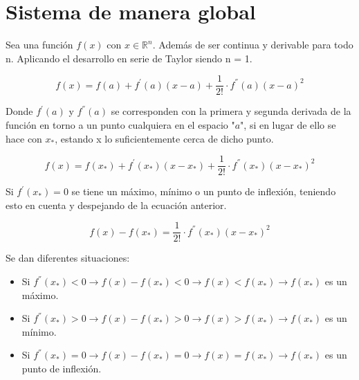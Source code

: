
\newpage
\thispagestyle{empty}
\mbox{}
\chapter{Sistema de manera global}
\label{ch:chapter2}

Sea una función $f\left(x\right)$ con $x\in\mathbb{R}^{n}$. Además de ser continua y derivable para todo n. Aplicando el desarrollo en serie de Taylor siendo n = 1.

\begin{equation*}
	f\left(x\right)=f\left(a\right)+f^{'}\left(a\right)\left(x-a\right)+\frac{1}{2!}\cdot{f}^{''}\left(a\right){\left(x-a\right)}^{2}
\end{equation*}

Donde $f^{'}\left(a\right)$ y $f^{''}\left(a\right)$ se corresponden con la primera y segunda derivada de la función en torno a un punto cualquiera en el espacio "$a$", si en lugar de ello se hace con $x_*$, estando x lo suficientemente cerca de dicho punto.

\begin{equation*}
	f\left(x\right)=f\left(x_{*}\right)+f^{'}\left(x_{*}\right)\left(x-x_{*}\right)+\frac{1}{2!}\cdot{f}^{''}\left(x_{*}\right){\left(x-x_{*}\right)}^2 
\end{equation*}

Si $f^{'}\left(x_{*}\right)=0$ se tiene un máximo, mínimo o un punto de inflexión, teniendo esto en cuenta y despejando de la ecuación anterior.

\begin{equation*}
	f\left(x\right)-f\left(x_{*}\right)=\frac{1}{2!}\cdot{f}^{''}\left(x_{*}\right){\left(x-x_{*}\right)}^2 
\end{equation*}

\newpage

Se dan diferentes situaciones:

\begin{itemize}
	\item Si $f^{''}\left(x_{*}\right)<0\rightarrow{f}\left(x\right)-f\left(x_{*}\right)<0\rightarrow{f}\left(x\right)<f\left(x_{*}\right)\rightarrow{f}\left(x_{*}\right)$ es un máximo.
	\item Si $f^{''}\left(x_{*}\right)>0\rightarrow{f}\left(x\right)-f\left(x_{*}\right)>0\rightarrow{f}\left(x\right)>f\left(x_{*}\right)\rightarrow{f}\left(x_{*}\right)$ es un mínimo.
	\item Si $f^{''}\left(x_{*}\right)=0\rightarrow{f}\left(x\right)-f\left(x_{*}\right)=0\rightarrow{f}\left(x\right)=f\left(x_{*}\right)\rightarrow{f}\left(x_{*}\right)$ es un punto de inflexión.
\end{itemize}

